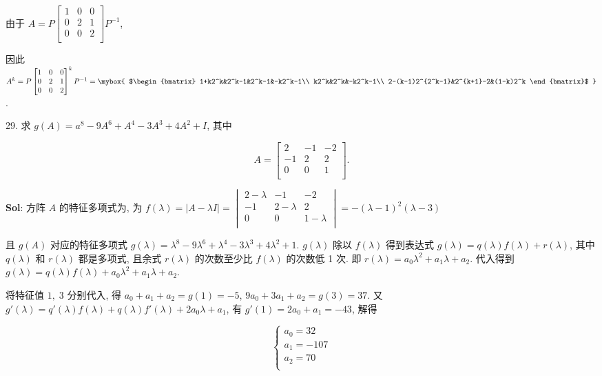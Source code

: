 由于 $A=P\begin{bmatrix}
    1&0&0\\
    0&2&1\\
    0&0&2\\
\end{bmatrix}P^{-1}$,

因此 $A^k=P\begin{bmatrix}
    1&0&0\\
    0&2&1\\
    0&0&2\\
\end{bmatrix}^kP^{-1}
=\mybox{
$\begin{bmatrix}
    1+k2^k&2^k-1&2^k-1&-k2^k-1\\
    k2^k&2^k&-k2^k-1\\
    2-(k-1)2^{2^k-1}&2^{k+1}-2&(1-k)2^k
\end{bmatrix}$
}$.


\vspace{12pt}

29. 求 $g(A)=a^8-9A^6+A^4-3A^3+4A^2+I$, 其中

$$
A=
\begin{bmatrix}
    2&-1&-2\\
    -1&2&2\\
    0&0&1\\
\end{bmatrix}.
$$

\textbf{Sol}: 方阵 $A$ 的特征多项式为, 为 $f(\lambda)=|A-\lambda I|=\begin{vmatrix}
    2-\lambda&-1&-2\\
    -1&2-\lambda&2\\
    0&0&1-\lambda\\
\end{vmatrix}=-(\lambda-1)^2(\lambda-3)$

且 $g(A)$ 对应的特征多项式 $g(\lambda)=\lambda^8-9\lambda^6+\lambda^4-3\lambda^3+4\lambda^2+1$.  $g(\lambda)$ 除以 $f(\lambda)$ 得到表达式 $g(\lambda)=q(\lambda)f(\lambda)+r(\lambda)$, 其中 $q(\lambda)$ 和 $r(\lambda)$ 都是多项式, 且余式 $r(\lambda)$ 的次数至少比 $f(\lambda)$ 的次数低 1 次. 即 $r(\lambda)=a_0\lambda^2+a_1\lambda+a_2$. 代入得到 $g(\lambda)=q(\lambda)f(\lambda)+a_0\lambda^2+a_1\lambda+a_2$.

将特征值 $1,\;3$ 分别代入, 得 $a_0+a_1+a_2=g(1)=-5$, $9a_0+3a_1+a_2=g(3)=37$. 又 $g'(\lambda)=q'(\lambda)f(\lambda)+q(\lambda)f'(\lambda)+2a_0\lambda+a_1$, 有 $g'(1)=2a_0+a_1=-43$, 解得

$$
\begin{cases}
a_0=32\\
a_1=-107\\
a_2=70\\
\end{cases}
$$

